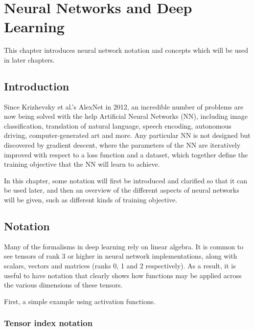 \chapter{Neural Networks and Deep Learning}
\label{C:background}

This chapter introduces neural network notation and concepts which will be used in later chapters.

\section{Introduction}

Since Krizhevsky et al.'s AlexNet \cite{alexnet} in 2012, an incredible number of problems are now being solved with the help Artificial Neural Networks (NN), including image classification, translation of natural language, speech encoding, autonomous driving, computer-generated art and more. Any particular NN is not designed but discovered by gradient descent, where the parameters of the NN are iteratively improved with respect to a loss function and a dataset, which together define the training objective that the NN will learn to achieve.

In this chapter, some notation will first be introduced and clarified so that it can be used later, and then an overview of the different aspects of neural networks will be given, such as different kinds of training objective.

\section{Notation}
\label{ss:dl-notation}

Many of the formalisms in deep learning rely on linear algebra. It is common to see tensors of rank 3 or higher in neural network implementations, along with scalars, vectors and matrices (ranks 0, 1 and 2 respectively). As a result, it is useful to have notation that clearly shows how functions may be applied across the various dimensions of these tensors.

First, a simple example using activation functions.

\subsection{Tensor index notation}

